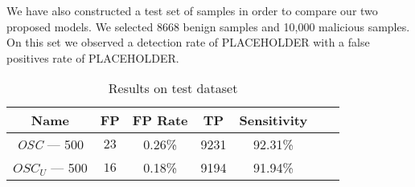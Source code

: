 \par
We have also constructed a test set of samples in order to compare our two proposed models. We selected 8668 benign samples and 10,000 malicious samples. On this set we observed a detection rate of PLACEHOLDER with a false positives rate of PLACEHOLDER.
\begin{table}[ht]
    \centering
    \begin{tabular}{| c | c | c | c | c | c | c | }
    \hline
    Name & FP & FP Rate & TP & Sensitivity\\ \hline
    \textit{OSC} --- 500 & $23$ & 0.26\% & 9231 & 92.31\% \\ \hline
    \textit{$OSC_{U}$} --- 500 & $16$ &  0.18\% & 9194 & 91.94\% \\ \hline
    \end{tabular}
    \caption{Results on test dataset} 
    \label{tab:testresults}
\end{table}